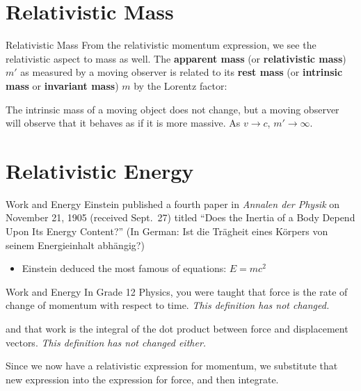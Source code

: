 \documentclass[12pt,compress,aspectratio=169]{beamer}
\newcommand{\mb}[1]{\mathbf{#1}}
\newcommand{\bigsqrt}{\ensuremath\sqrt{1-\left(\frac{v}{c}\right)^2}}
\newcommand{\eq}[2]{\vspace{#1}{\Large\begin{displaymath}#2\end{displaymath}}}
\begin{document}
\section[Relative Mass]{Relativistic Mass}

\begin{frame}{Relativistic Mass}
  From the relativistic momentum expression, we see the relativistic aspect to
  mass as well. The \textbf{apparent mass} (or \textbf{relativistic mass}) $m'$
  as measured by a moving observer is related to its \textbf{rest mass} (or
  \textbf{intrinsic mass} or \textbf{invariant mass}) $m$ by the Lorentz factor:

  \eq{-.18in}{
    \boxed{m'=\frac{m}{\bigsqrt}=\gamma m}
  }
  
  The intrinsic mass of a moving object does not change, but a moving observer
  will observe that it behaves as if it is more massive. As $v\rightarrow c$,
  $m'\rightarrow\infty$.
\end{frame}



\section[Energy]{Relativistic Energy}

\begin{frame}{Work and Energy}
  Einstein published a fourth paper in \emph{Annalen der Physik} on November
  21, 1905 (received Sept.\ 27) titled ``Does the Inertia of a Body Depend Upon
  Its Energy Content?'' (In German: Ist die Tr\"{a}gheit eines K\"{o}rpers von
  seinem Energieinhalt abh\"{a}ngig?)
  \begin{itemize}
  \item Einstein deduced the most famous of equations: $E=mc^2$
  \end{itemize}
\end{frame}


\begin{frame}{Work and Energy}
  In Grade 12 Physics, you were taught that force is the rate of change of
  momentum with respect to time. \emph{This definition has not changed.}

  \eq{-.2in}{
    \mb{F}=\frac{d\mb{p}}{dt}
  }

  \vspace{-.1in}and that work is the integral of the dot product between force
  and displacement vectors. \emph{This definition has not changed either.}

  \eq{-.2in}{
    W=\int\mb{F}\cdot d\mb{x}=\int\frac{d\mb{p}}{dt}\cdot \mb{dx}
  }

  \vspace{-.1in}Since we now have a relativistic expression for momentum, we
  substitute that new expression into the expression for force, and then
  integrate.
\end{frame}
\end{document}
